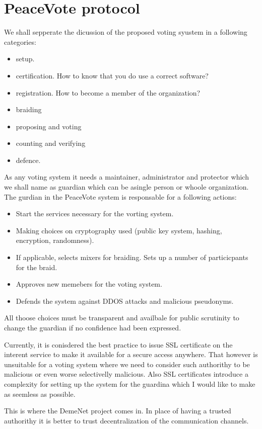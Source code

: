 \documentclass{article}
\begin{document}
\section{PeaceVote protocol}

We shall sepperate the dicussion of the proposed voting syustem in a following categories:
\begin{itemize}
  \item setup. 
  \item certification. How to know that you do use a correct software?
  \item registration. How to become a member of the organization?
  \item braiding
  \item proposing and voting
  \item counting and verifying
  \item defence. 
\end{itemize}


As any voting system it needs a maintainer, administrator and protector which we shall name as guardian which can be asingle person or whoole organization. The gurdian in the PeaceVote system is responsable for a following actions:
\begin{itemize}
\item Start the services necessary for the vorting system.
\item Making choices on cryptography used (public key system, hashing, encryption, randomness). 
\item If applicable, selects mixers for braiding. Sets up a number of particicpants for the braid.
\item Approves new memebers for the voting system.
\item Defends the system against DDOS attacks and malicious pseudonyms. 
\end{itemize}
All thoose choices must be transparent and availbale for public scrutinity to change the guardian if no confidence had been expressed. 

Currently, it is conisdered the best practice to issue SSL certificate on the interent service to make it available for a secure access anywhere. That however is unsuitable for a voting system where we need to consider such authorithy to be malicious or even worse selectivelly malicious. Also SSL certificates introduce a complexity for setting up the system for the guardina which I would like to make as seemless as possible.

This is where the DemeNet project comes in. In place of having a trusted authorithy it is better to trust decentralization of the communication channels. 
\end{document}
